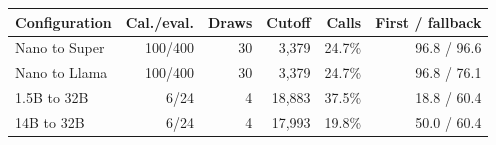 \begin{tabular}{lrrrrr}
\toprule
Configuration & Cal./eval. & Draws & Cutoff & Calls & First / fallback \\
\midrule
Nano to Super & 100/400 & 30 & 3,379 & 24.7\% & 96.8 / 96.6 \\
Nano to Llama & 100/400 & 30 & 3,379 & 24.7\% & 96.8 / 76.1 \\
1.5B to 32B & 6/24 & 4 & 18,883 & 37.5\% & 18.8 / 60.4 \\
14B to 32B & 6/24 & 4 & 17,993 & 19.8\% & 50.0 / 60.4 \\
\bottomrule
\end{tabular}
